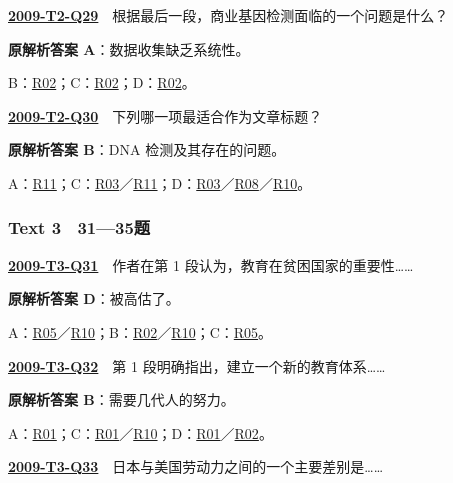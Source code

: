 \documentclass[11pt,a4paper]{article}
\begin{document}
\label{idx-2009-T2-Q29}\noindent\textbf{\href{https://zj139.github.io/math-notes/english/35e7c30a863ed5433f61ed2e/\#q29}{2009-T2-Q29}}　根据最后一段，商业基因检测面临的一个问题是什么？\par\nopagebreak
\noindent\textbf{原解析答案 A}：数据收集缺乏系统性。\par\nopagebreak
\noindent B：\hyperref[cat-R02]{R02}；C：\hyperref[cat-R02]{R02}；D：\hyperref[cat-R02]{R02}。\par\smallskip
{}\label{idx-2009-T2-Q30}\noindent\textbf{\href{https://zj139.github.io/math-notes/english/35e7c30a863ed5433f61ed2e/\#q30}{2009-T2-Q30}}　下列哪一项最适合作为文章标题？\par\nopagebreak
\noindent\textbf{原解析答案 B}：DNA 检测及其存在的问题。\par\nopagebreak
\noindent A：\hyperref[cat-R11]{R11}；C：\hyperref[cat-R03]{R03}／\hyperref[cat-R11]{R11}；D：\hyperref[cat-R03]{R03}／\hyperref[cat-R08]{R08}／\hyperref[cat-R10]{R10}。\par\smallskip
\clearpage
{}\subsubsection{Text 3　31—35题}
\label{idx-2009-T3-Q31}\noindent\textbf{\href{https://zj139.github.io/math-notes/english/218135c1190c9ac029fd9ef3/\#q31}{2009-T3-Q31}}　作者在第 1 段认为，教育在贫困国家的重要性……\par\nopagebreak
\noindent\textbf{原解析答案 D}：被高估了。\par\nopagebreak
\noindent A：\hyperref[cat-R05]{R05}／\hyperref[cat-R10]{R10}；B：\hyperref[cat-R02]{R02}／\hyperref[cat-R10]{R10}；C：\hyperref[cat-R05]{R05}。\par\smallskip
{}\label{idx-2009-T3-Q32}\noindent\textbf{\href{https://zj139.github.io/math-notes/english/218135c1190c9ac029fd9ef3/\#q32}{2009-T3-Q32}}　第 1 段明确指出，建立一个新的教育体系……\par\nopagebreak
\noindent\textbf{原解析答案 B}：需要几代人的努力。\par\nopagebreak
\noindent A：\hyperref[cat-R01]{R01}；C：\hyperref[cat-R01]{R01}／\hyperref[cat-R10]{R10}；D：\hyperref[cat-R01]{R01}／\hyperref[cat-R02]{R02}。\par\smallskip
{}\label{idx-2009-T3-Q33}\noindent\textbf{\href{https://zj139.github.io/math-notes/english/218135c1190c9ac029fd9ef3/\#q33}{2009-T3-Q33}}　日本与美国劳动力之间的一个主要差别是……\par\nopagebreak
\end{document}
